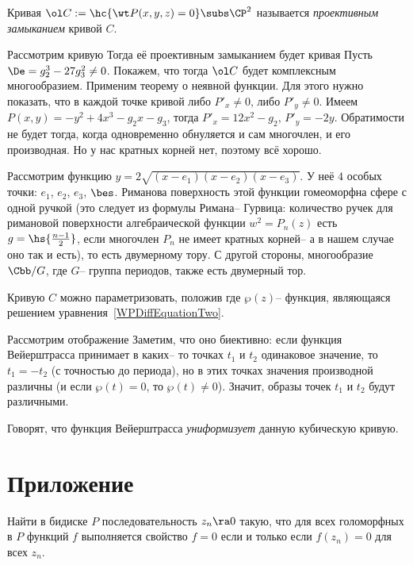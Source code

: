\documentclass[a4paper]{article}
\begin{document}
\begin{df}
Кривая $\ol C := \hc{\wt P(x,y,z) =0}\subs \CP^2$ называется \emph{проективным
замыканием} кривой $C$.
\end{df}

Рассмотрим кривую
Тогда её проективным замыканием будет кривая
Пусть $\De = g_2^3-27g_3^2 \neq 0$.  Покажем, что тогда $\ol C$ будет
комплексным многообразием.
Применим теорему о неявной функции. Для этого нужно показать,
что в каждой точке кривой либо $P'_x\neq 0$, либо $P'_y\neq 0$.
Имеем $P(x,y) = -y^2 + 4x^3-g_2x-g_3$, тогда $P'_x = 12x^2-g_2$, $P'_y = -2y$.
Обратимости не будет тогда, когда одновременно обнуляется и сам многочлен,
и его производная. Но у нас кратных корней нет, поэтому всё хорошо.

Рассмотрим функцию $y  = 2\sqrt{(x-e_1)(x-e_2)(x-e_3)}$. У неё $4$ особых
точки: $e_1$, $e_2$, $e_3$, $\bes$. Риманова поверхность этой функции гомеоморфна
сфере с одной ручкой (это следует из формулы Римана-- Гурвица: количество ручек
для римановой поверхности алгебраической функции $w^2 = P_n(z)$ есть $g = \hs{\frac{n-1}{2}}$, если
многочлен $P_n$ не имеет кратных корней-- а в нашем случае оно так и есть), то есть двумерному тору.
С другой стороны, многообразие $\Cbb/G$, где $G$-- группа периодов, также есть двумерный тор.

Кривую $C$ можно параметризовать, положив
где $\wp(z)$-- функция, являющаяся решением уравнения~\eqref{WPDiffEquationTwo}.

Рассмотрим отображение
Заметим, что оно биективно: если функция Вейерштрасса принимает в каких-- то
точках $t_1$ и $t_2$ одинаковое значение, то $t_1 = -t_2$ (с точностью до периода),
но в этих точках значения производной различны (и если $\wp (t)=0$, то $\wp (t)\neq 0$).
Значит, образы точек $t_1$ и $t_2$ будут различными.

Говорят, что функция Вейерштрасса \emph{униформизует} данную кубическую кривую.


\section{Приложение}

\begin{problem}
Найти в бидиске $P$ последовательность $z_n\ra 0$ такую, что для всех голоморфных
в $P$ функций $f$ выполняется свойство $f = 0$ если и только если $f(z_n) = 0$ для всех $z_n$.
\end{problem}
\end{document}
